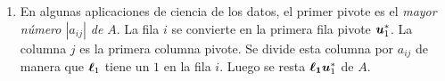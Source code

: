 \documentclass[12pt,a4paper]{article}
\newcommand{\bi}[1]{\hbox{\boldmath$#1$}}
\newcommand\1{\mbox{\,\vrule height-0.8pt depth1.0pt width2pc\,}}
\newcommand\2{\mbox{\,\vrule height-0.8pt depth1.0pt width1pc\,}}
\newcommand{\bu}{\hbox{\boldmath$u$}}
\begin{document}
\begin{enumerate}
\vspace{-9pt}


\noindent
Explique la respuesta\,: $A_k$ se factoriza como  \1  ya que $LU=\left[
\begin{array}{ll}
L_k & 0	\\
\ast & \ast
\end{array}
\right]\left[
\begin{array}{ll}
U_k & \ast	\\
0 & \ast
\end{array}
\right]$.




\item En algunas aplicaciones de ciencia de los datos, el primer pivote es el \emph{mayor n\'umero $|a_{ij}|$ de} $A$. %
La fila $i$ se convierte en la primera fila pivote $\bu_1^*$. La columna $j$ es la primera columna pivote. Se divide esta columna por $a_{ij}$ de manera que $\bi{\ell}_1$ tiene un $1$ en la fila $i$. Luego se resta
  $\bi{\ell_1}\bu_1^\ast$ de $A$. %


\end{enumerate}
\end{document}
